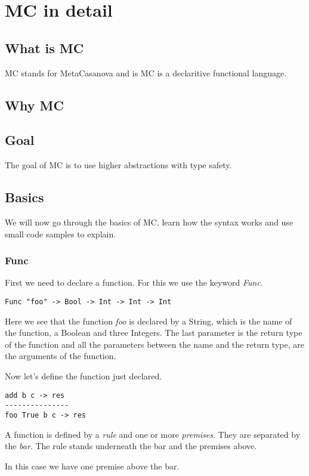 \chapter{MC in detail}

\section{What is MC}
MC stands for MetaCasanova and is MC is a declaritive functional language.
\section{Why MC}


\section{Goal}
The goal of MC is to use higher abstractions with type safety.

\section{Basics}
We will now go through the basics of MC.
learn how the syntax works and use small code samples to explain.


\subsection{Func}
First we need to declare a function.
For this we use the keyword \emph{Func}.

\begin{lstlisting}
Func "foo" -> Bool -> Int -> Int -> Int
\end{lstlisting}

Here we see that the function \emph{foo} is declared by a String, which is the name of the function, a Boolean and three Integers.
The last parameter is the return type of the function and all the parameters between the name and the return type, are the arguments of the function.

Now let's define the function just declared.
\begin{lstlisting}
add b c -> res
---------------
foo True b c -> res
\end{lstlisting}

A function is defined by a \emph{rule} and one or more \emph{premises}.
They are separated by the \emph{bar}.
The rule stands underneath the bar and the premises above.

In this case we have one premise above the bar.

